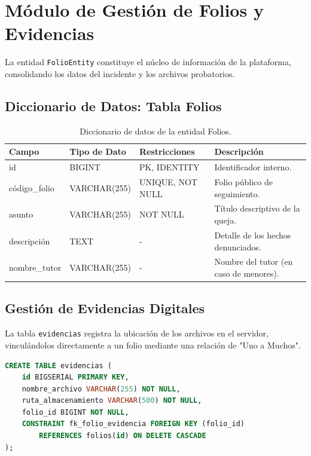\section{Módulo de Gestión de Folios y Evidencias}
La entidad \texttt{FolioEntity} constituye el núcleo de información de la plataforma, consolidando los datos del incidente y los archivos probatorios.

\subsection{Diccionario de Datos: Tabla Folios}
\begin{table}[H]
\centering
\small
\begin{tabularx}{\textwidth}{|l|l|l|X|}
\hline
\rowcolor{azulESCOM} 
\color{white}\textbf{Campo} & \color{white}\textbf{Tipo de Dato} & \color{white}\textbf{Restricciones} & \color{white}\textbf{Descripción} \\ \hline
id & BIGINT & PK, IDENTITY & Identificador interno. \\ \hline
código\_folio & VARCHAR(255) & UNIQUE, NOT NULL & Folio público de seguimiento. \\ \hline
asunto & VARCHAR(255) & NOT NULL & Título descriptivo de la queja. \\ \hline
descripción & TEXT & - & Detalle de los hechos denunciados. \\ \hline
nombre\_tutor & VARCHAR(255) & - & Nombre del tutor (en caso de menores). \\ \hline
\end{tabularx}
\caption{Diccionario de datos de la entidad Folios.}
\label{tab:dict_folios}
\end{table}

\subsection{Gestión de Evidencias Digitales}
La tabla \texttt{evidencias} registra la ubicación de los archivos en el servidor, vinculándolos directamente a un folio mediante una relación de "Uno a Muchos".

\begin{lstlisting}[language=SQL, caption={Script DDL para la tabla de evidencias.}]
CREATE TABLE evidencias (
    id BIGSERIAL PRIMARY KEY,
    nombre_archivo VARCHAR(255) NOT NULL,
    ruta_almacenamiento VARCHAR(500) NOT NULL,
    folio_id BIGINT NOT NULL,
    CONSTRAINT fk_folio_evidencia FOREIGN KEY (folio_id) 
        REFERENCES folios(id) ON DELETE CASCADE
);
\end{lstlisting}

